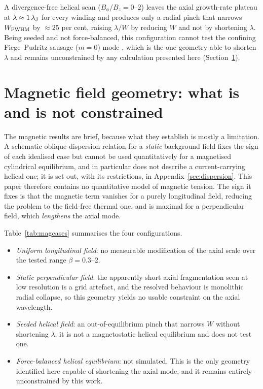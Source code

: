 \documentclass[usenatbib,twoside,twocolumn]{mnras}
\begin{document}
A divergence-free helical scan ($B_\phi/B_z=0$--$2$) leaves the axial growth-rate plateau at $\lambda\approx1\,\lambda_{\rm J}$ for every winding and produces only a radial pinch that narrows $W_{\rm FWHM}$ by $\approx25$ per cent, raising $\lambda/W$ by reducing $W$ and not by shortening $\lambda$. Being seeded and not force-balanced, this configuration cannot test the confining Fiege--Pudritz sausage ($m=0$) mode \citep{Fiege2000}, which is the one geometry able to shorten $\lambda$ and remains unconstrained by any calculation presented here (Section~\ref{sec:fields}).


\section{Magnetic field geometry: what is and is not constrained}
\label{sec:fields}


The magnetic results are brief, because what they establish is mostly a limitation. A schematic oblique dispersion relation for a \emph{static} background field \citep{Nakamura1993} fixes the sign of each idealised case but cannot be used quantitatively for a magnetised cylindrical equilibrium, and in particular does not describe a current-carrying helical one; it is set out, with its restrictions, in Appendix~\ref{sec:dispersion}. This paper therefore contains no quantitative model of magnetic tension. The sign it fixes is that the magnetic term vanishes for a purely longitudinal field, reducing the problem to the field-free thermal one, and is maximal for a perpendicular field, which \emph{lengthens} the axial mode.

Table~\ref{tab:magcases} summarises the four configurations.

\begin{itemize}\setlength{\itemsep}{1pt}
\item \emph{Uniform longitudinal field}: no measurable modification of the axial scale over the tested range $\beta=0.3$--$2$.
\item \emph{Static perpendicular field}: the apparently short axial fragmentation seen at low resolution is a grid artefact, and the resolved behaviour is monolithic radial collapse, so this geometry yields no usable constraint on the axial wavelength.
\item \emph{Seeded helical field}: an out-of-equilibrium pinch that narrows $W$ without shortening $\lambda$; it is not a magnetostatic helical equilibrium and does not test one.
\item \emph{Force-balanced helical equilibrium}: not simulated. This is the only geometry identified here capable of shortening the axial mode, and it remains entirely unconstrained by this work.
\end{itemize}
\end{document}
